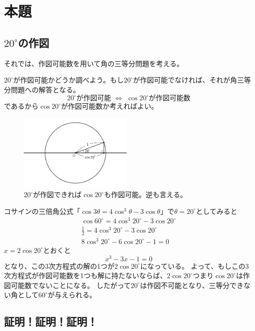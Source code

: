 %
\section{本題}
\subsection{$20^\circ$の作図}
それでは、作図可能数を用いて角の三等分問題を考える。\par
$20^\circ$が作図可能かどうか調べよう。もし$20^\circ$が作図可能でなければ、それが角三等分問題への解答となる。
$$
20^\circ\text{が作図可能} \,\,\Longleftrightarrow\,\, \cos 20^\circ \text{が作図可能数}
$$
であるから$\cos 20^\circ$が作図可能数か考えればよい。
\begin{figure}[H]
  \centering
  \includegraphics[clip, width=5.5cm]{nakayama2/image/cos20do.png}\\
  \small $20^\circ$が作図できれば$\cos 20^\circ$も作図可能。逆も言える。
\end{figure}

コサインの三倍角公式「$\cos 3\theta = 4\cos^3 \theta - 3\cos\theta$」で$\theta = 20^\circ$としてみると
\begin{align*}
  \cos 60^\circ = 4\cos^3 20^\circ - 3\cos 20^\circ \\
  \frac{1}{2} = 4\cos^3 20^\circ - 3\cos 20^\circ \\
  8\cos^3 20^\circ - 6\cos 20^\circ - 1 = 0
\end{align*}
$x = 2\cos 20^\circ$とおくと
$$ x^3 - 3x -1 = 0 $$
となり、この3次方程式の解の1つが$2\cos 20^\circ$になっている。
よって、もしこの3次方程式が作図可能数を1つも解に持たないならば、$2\cos 20^\circ$つまり$\cos 20^\circ$は作図可能数でないことになる。
したがって$20^\circ$は作図不可能となり、三等分できない角として$60^\circ$が与えられる。


\subsection{証明！証明！証明！}
